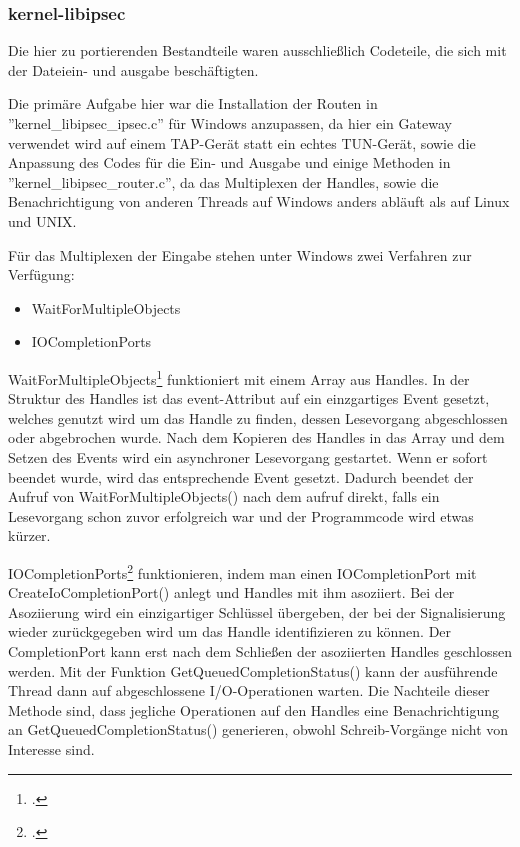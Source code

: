 \subsubsection{kernel-libipsec}
Die hier zu portierenden Bestandteile waren ausschließlich Codeteile, die
sich mit der Dateiein- und ausgabe beschäftigten.

Die primäre Aufgabe hier war die Installation der Routen in ''kernel\_libipsec\_ipsec.c''
für Windows anzupassen, da hier ein Gateway verwendet wird auf einem TAP-Gerät
statt ein echtes TUN-Gerät, sowie die Anpassung des Codes für die Ein- und Ausgabe 
und einige Methoden in
''kernel\_libipsec\_router.c'', da das Multiplexen der Handles, sowie die Benachrichtigung
von anderen Threads auf Windows anders abläuft als auf Linux und UNIX.

Für das Multiplexen der Eingabe stehen unter Windows zwei Verfahren zur Verfügung:
\begin{itemize}
\item WaitForMultipleObjects
\item IOCompletionPorts
\end{itemize}

WaitForMultipleObjects\footcite[][]{_waitformultipleobjects_2016} funktioniert mit einem Array aus Handles. In der Struktur des Handles
ist das event-Attribut auf ein einzgartiges Event gesetzt, welches genutzt wird um
das Handle zu finden, dessen Lesevorgang abgeschlossen oder abgebrochen wurde.
Nach dem Kopieren des Handles in das Array und dem Setzen des Events wird ein asynchroner
Lesevorgang gestartet. Wenn er sofort beendet wurde, wird das entsprechende Event gesetzt.
Dadurch beendet der Aufruf von WaitForMultipleObjects() nach dem aufruf direkt, falls
ein Lesevorgang schon zuvor erfolgreich war und der Programmcode wird etwas kürzer.

IOCompletionPorts\footcite[][]{_createiocompletionport_2016} funktionieren, indem man einen IOCompletionPort mit CreateIoCompletionPort()
anlegt und Handles mit ihm asoziiert. Bei der Asoziierung wird ein einzigartiger Schlüssel
übergeben, der bei der Signalisierung wieder zurückgegeben wird um das Handle identifizieren zu können.
Der CompletionPort kann erst nach dem Schließen der asoziierten Handles geschlossen werden.
Mit der Funktion GetQueuedCompletionStatus() kann der ausführende Thread dann auf abgeschlossene
I/O-Operationen warten.
Die Nachteile dieser Methode sind, dass jegliche Operationen auf den Handles eine Benachrichtigung
an GetQueuedCompletionStatus() generieren, obwohl Schreib-Vorgänge nicht von Interesse sind.

